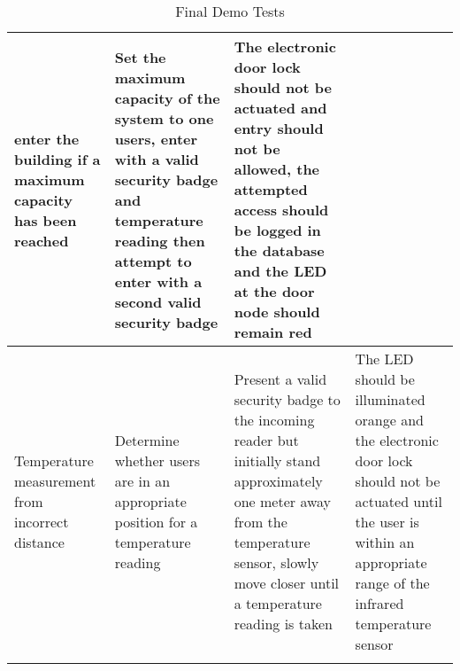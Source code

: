 \begin{longtable}[htb]{>{\centering\arraybackslash}m{3cm}|>{\centering\arraybackslash}m{3.5cm}|>{\centering\arraybackslash}m{3cm}|>{\centering\arraybackslash}m{3.5cm}}
enter the building if a maximum capacity has been reached & Set the maximum
capacity of the system to one users, enter with a valid security badge and
temperature reading then attempt to enter with a second valid security badge &
The electronic door lock should not be actuated and entry should not be allowed,
the attempted access should be logged in the database and the LED at the door
node should remain red \\
\hline
Temperature measurement from incorrect distance & Determine whether users are in
an appropriate position for a temperature reading & Present a valid security
badge to the incoming reader but initially stand approximately one meter away
from the temperature sensor, slowly move closer until a temperature reading is
taken & The LED should be illuminated orange and the electronic door lock should
not be actuated until the user is within an appropriate range of the infrared
temperature sensor \\
\bottomrule
\caption{Final Demo Tests}
\label{table:final-tests}
\end{longtable}

